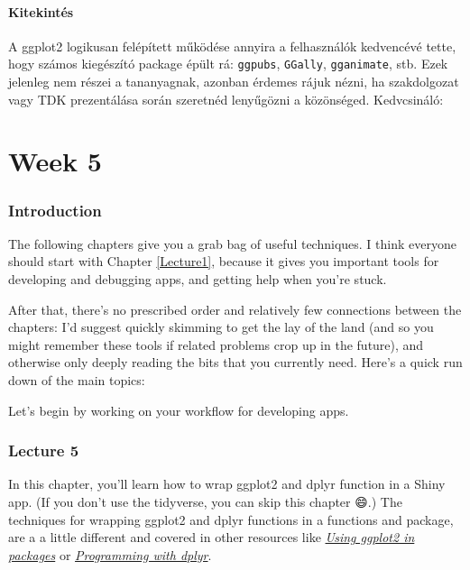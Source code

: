 \documentclass[
]{article}
\begin{document}
\hypertarget{kitekintuxe9s}{%
\subsection{Kitekintés}\label{kitekintuxe9s}}

A ggplot2 logikusan felépített működése annyira a felhasználók kedvencévé tette, hogy számos kiegészító package épült rá: \texttt{ggpubs}, \texttt{GGally}, \texttt{gganimate}, stb. Ezek jelenleg nem részei a tananyagnak, azonban érdemes rájuk nézni, ha szakdolgozat vagy TDK prezentálása során szeretnéd lenyűgözni a közönséged. Kedvcsináló:

\hypertarget{part-week-5}{%
\part*{Week 5}\label{part-week-5}}

\hypertarget{week5-intro}{%
\section*{Introduction}\label{week5-intro}}

The following chapters give you a grab bag of useful techniques.
I think everyone should start with Chapter \ref{Lecture1}, because it gives you important tools for developing and debugging apps, and getting help when you're stuck.

After that, there's no prescribed order and relatively few connections between the chapters: I'd suggest quickly skimming to get the lay of the land (and so you might remember these tools if related problems crop up in the future), and otherwise only deeply reading the bits that you currently need.
Here's a quick run down of the main topics:

Let's begin by working on your workflow for developing apps.

\hypertarget{lecture5}{%
\section{Lecture 5}\label{lecture5}}

In this chapter, you'll learn how to wrap ggplot2 and dplyr function in a Shiny app.
(If you don't use the tidyverse, you can skip this chapter 😄.) The techniques for wrapping ggplot2 and dplyr functions in a functions and package, are a a little different and covered in other resources like \href{http://ggplot2.tidyverse.org/dev/articles/ggplot2-in-packages.html}{\emph{Using ggplot2 in packages}} or \href{http://dplyr.tidyverse.org/articles/programming.html}{\emph{Programming with dplyr}}.
\end{document}
